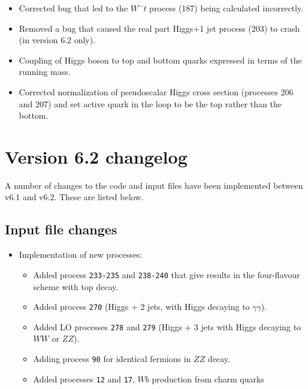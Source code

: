 \documentclass[12pt]{article}
\begin{document}
\begin{itemize}
\item Corrected bug that led to the $W^-t$ process (187) being calculated incorrectly.

\item Removed a bug that caused the real part Higgs+1 jet process (203) 
to crash (in version 6.2 only).

\item
Coupling of Higgs boson to top and bottom quarks expressed in terms of the running mass.

\item
Corrected normalization of pseudoscalar Higgs cross section (processes 206 and 207)
and set active quark in the loop to be the top rather than the bottom.

\end{itemize}

\section{Version 6.2 changelog}
\label{changelog6.2}

A number of changes to the code and input files have been implemented
between v6.1 and v6.2. These are listed below.

\subsection{Input file changes}
\begin{itemize}
\item Implementation of new processes:
\begin{itemize}
\item 
Added process {\tt 233-235} and {\tt 238-240} that give results in the four-flavour scheme
      with top decay.
\item 
Added process {\tt 270} (Higgs + 2 jets, with Higgs decaying to $\gamma \gamma$).
\item 
Added LO processes {\tt 278} and {\tt 279} (Higgs + 3 jets with Higgs decaying to $WW$ or $ZZ$).
\item 
Adding process {\tt 90} for identical fermions in $ZZ$ decay.
\item
Added processes {\tt 12} and {\tt 17}, $Wb$ production from charm quarks
\end{itemize}
\end{itemize}
\end{document}
